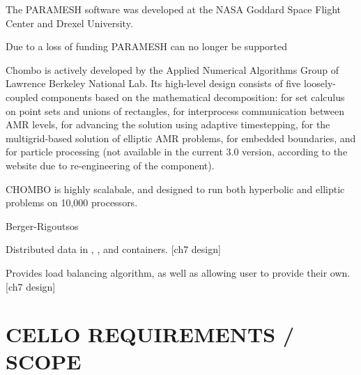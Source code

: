 \documentclass[14pt,letter]{article}
\begin{document}

\nocite{wwwparamesh}
\nocite{MaOl00} %
\nocite{OlMa05}
\nocite{Ol06}

The PARAMESH software was developed at the NASA Goddard Space Flight
Center and Drexel University.

Due to a loss of funding PARAMESH can no longer be supported


\nocite{wwwchombo}
\nocite{CoGr09}

Chombo is actively developed by the Applied Numerical Algorithms Group
of Lawrence Berkeley National Lab.  Its high-level design consists of
five loosely-coupled components based on the mathematical
decomposition:  for set calculus on point sets and
unions of rectangles,  for interprocess communication
between AMR levels,  for advancing the solution
using adaptive timestepping,  for the
multigrid-based solution of elliptic AMR problems,  for
embedded boundaries, and  for particle processing
(not available in the current 3.0 version, according to the website
due to re-engineering of the component).

CHOMBO is highly scalabale, and designed to run both hyperbolic and
elliptic problems on 10,000 processors.

Berger-Rigoutsos 


Distributed data in , , and 
 containers. [ch7 design]

Provides load balancing algorithm, as well as allowing user to provide their own.
[ch7 design]







\section{CELLO REQUIREMENTS / SCOPE} \label{s:requirements}

\end{document}
